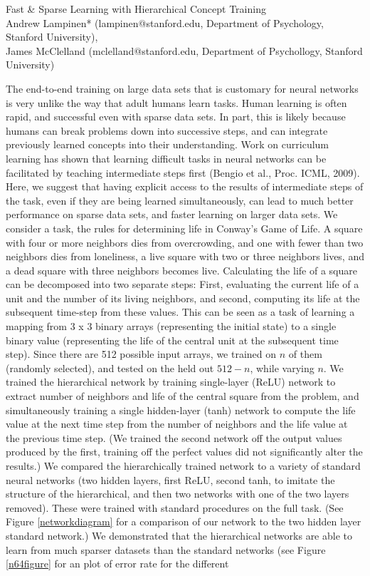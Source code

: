 \documentclass[10pt]{article}
\begin{document}
\begingroup  
  \centering
  \large Fast \& Sparse Learning with Hierarchical Concept Training\\[1.5em]
  \small{Andrew Lampinen* (lampinen@stanford.edu, Department of Psychology, Stanford University),\\ James McClelland (mclelland@stanford.edu, Department of Psychollogy, Stanford University)}\par
\endgroup
\vspace{10pt}
\noindent
The end-to-end training on large data sets that is customary for neural networks is very unlike the way that adult humans learn tasks. Human learning is often rapid, and successful even with sparse data sets. In part, this is likely because humans can break problems down into successive steps, and can integrate previously learned concepts into their understanding. Work on curriculum learning has shown that learning difficult tasks in neural networks can be facilitated by teaching intermediate steps first (Bengio et al., Proc. ICML, 2009). Here, we suggest that having explicit access to the results of intermediate steps of the task, even if they are being learned simultaneously, can lead to much better performance on sparse data sets, and faster learning on larger data sets. We consider a task, the rules for determining life in Conway’s Game of Life. A square with four or more neighbors dies from overcrowding, and one with fewer than two neighbors dies from loneliness, a live square with two or three neighbors lives, and a dead square with three neighbors becomes live. Calculating the life of a square can be decomposed into two separate steps: First, evaluating the current life of a unit and the number of its living neighbors, and second, computing its life at the subsequent time-step from these values. This can be seen as a task of learning a mapping from 3 x 3 binary arrays (representing the initial state) to a single binary value (representing the life of the central unit at the subsequent time step). Since there are 512 possible input arrays, we trained on $n$ of them (randomly selected), and tested on the held out $512-n$, while varying $n$. We trained the hierarchical network by training single-layer (ReLU) network to extract number of neighbors and life of the central square from the problem, and simultaneously training a single hidden-layer (tanh) network to compute the life value at the next time step from the number of neighbors and the life value at the previous time step. (We trained the second network off the output values produced by the first, training off the perfect values did not significantly alter the results.) We compared the hierarchically trained network to a variety of standard neural networks (two hidden layers, first ReLU, second tanh, to imitate the structure of the hierarchical, and then two networks with one of the two layers removed). These were trained with standard procedures on the full task. (See Figure \ref{networkdiagram} for a comparison of our network to the two hidden layer standard network.) We demonstrated that the hierarchical networks are able to learn from much sparser datasets than the standard networks (see Figure \ref{n64figure} for an plot of error rate for the different 
\end{document}
